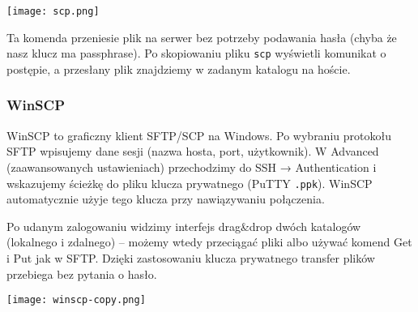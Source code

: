 \documentclass{article}
\begin{document}
\begin{multicols}{2}
\noindent
\texttt{[image: scp.png]}

Ta komenda przeniesie plik na serwer bez potrzeby podawania hasła (chyba że nasz klucz ma passphrase). Po skopiowaniu pliku \verb|scp| wyświetli komunikat o postępie, a przesłany plik znajdziemy w zadanym katalogu na hoście.

\subsubsection{WinSCP}
WinSCP to graficzny klient SFTP/SCP na Windows. Po wybraniu protokołu SFTP wpisujemy dane sesji (nazwa hosta, port, użytkownik). W Advanced (zaawansowanych ustawieniach) przechodzimy do SSH → Authentication i wskazujemy ścieżkę do pliku klucza prywatnego (PuTTY \verb|.ppk|)\cite{superuser}. WinSCP automatycznie użyje tego klucza przy nawiązywaniu połączenia. 

Po udanym zalogowaniu widzimy interfejs drag\&drop dwóch katalogów (lokalnego i zdalnego) – możemy wtedy przeciągać pliki albo używać komend Get i Put jak w SFTP. Dzięki zastosowaniu klucza prywatnego transfer plików przebiega bez pytania o hasło.

\noindent
\texttt{[image: winscp-copy.png]}

\end{multicols}
\end{document}
